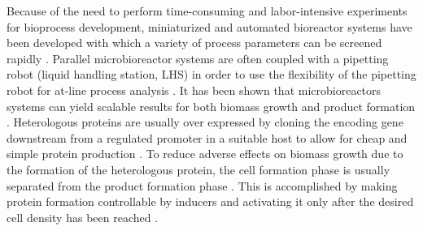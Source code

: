 \documentclass[sn-standardnature]{sn-jnl}%
\theoremstyle{thmstyleone}%
\theoremstyle{thmstyletwo}%
\theoremstyle{thmstylethree}%
\begin{document}
Because of the need to perform time-consuming and labor-intensive experiments for bioprocess development, miniaturized and automated bioreactor systems have been developed with which a variety of process parameters can be screened rapidly \cite{weuster2005parallel,hemmerich2018microbioreactor}.
Parallel microbioreactor systems are often coupled with a pipetting robot (liquid handling station, LHS) in order to use the flexibility of the pipetting robot for at-line process analysis \cite{haby2019integrated,puskeiler2005development,rohe2012automated}. It has been shown that microbioreactors systems can yield scalable results for both biomass growth and product formation \cite{puskeiler2005development,schmideder2016high,kensy2009scale}.
Heterologous proteins are usually over expressed by cloning the encoding gene downstream from a regulated promoter in a suitable host to allow for cheap and simple protein production \cite{terpe2006overview}.
To reduce adverse effects on biomass growth due to the formation of the heterologous protein, the cell formation phase is usually separated from the product formation phase \cite{choi2000efficient,schmideder2016high,jahic2006process,neubauer2001expression}.
This is accomplished by making protein formation controllable by inducers and activating it only after the desired cell density has been reached \cite{neubauer2001expression}.
\end{document}
